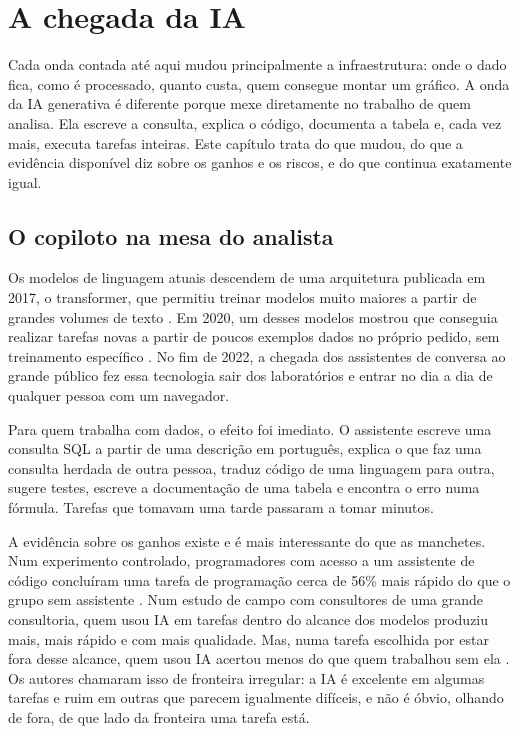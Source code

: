 \chapter{A chegada da IA}
\label{cap:ia}

Cada onda contada até aqui mudou principalmente a infraestrutura: onde o dado fica, como
é processado, quanto custa, quem consegue montar um gráfico. A onda da IA generativa é
diferente porque mexe diretamente no trabalho de quem analisa. Ela escreve a consulta,
explica o código, documenta a tabela e, cada vez mais, executa tarefas inteiras. Este
capítulo trata do que mudou, do que a evidência disponível diz sobre os ganhos e os
riscos, e do que continua exatamente igual.

\section{O copiloto na mesa do analista}
\label{sec:copiloto}

Os modelos de linguagem atuais descendem de uma arquitetura publicada em 2017, o
transformer, que permitiu treinar modelos muito maiores a partir de grandes volumes de
texto \parencite{vaswani2017}. Em 2020, um desses modelos mostrou que conseguia realizar
tarefas novas a partir de poucos exemplos dados no próprio pedido, sem treinamento
específico \parencite{brown2020}. No fim de 2022, a chegada dos assistentes de
conversa ao grande público fez essa tecnologia sair dos laboratórios e entrar no dia a
dia de qualquer pessoa com um navegador.

Para quem trabalha com dados, o efeito foi imediato. O assistente escreve uma consulta
SQL a partir de uma descrição em português, explica o que faz uma consulta herdada de
outra pessoa, traduz código de uma linguagem para outra, sugere testes, escreve a
documentação de uma tabela e encontra o erro numa fórmula. Tarefas que tomavam uma tarde
passaram a tomar minutos.

A evidência sobre os ganhos existe e é mais interessante do que as manchetes. Num
experimento controlado, programadores com acesso a um assistente de código concluíram
uma tarefa de programação cerca de 56\% mais rápido do que o grupo sem assistente
\parencite{peng2023}. Num estudo de campo com consultores de uma grande consultoria,
quem usou IA em tarefas dentro do alcance dos modelos produziu mais, mais rápido e com
mais qualidade. Mas, numa tarefa escolhida por estar fora desse alcance, quem usou IA
acertou menos do que quem trabalhou sem ela \parencite{dellacqua2023}. Os autores
chamaram isso de fronteira irregular: a IA é excelente em algumas tarefas e ruim em
outras que parecem igualmente difíceis, e não é óbvio, olhando de fora, de que lado da
fronteira uma tarefa está.

